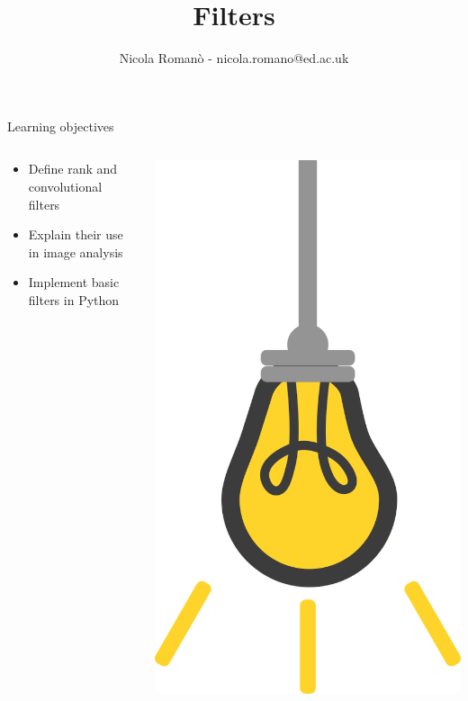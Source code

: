 \documentclass[9pt, aspectratio=169]{beamer}
\author{Nicola Roman\`o - nicola.romano@ed.ac.uk}
\title{Filters}
\date{}
\begin{document}

\begin{frame}
    \titlepage
\end{frame}

\begin{frame}
    {Learning objectives}
    \begin{columns}
        \begin{column}{0.8\textwidth}
            \begin{itemize}
                \item Define rank and convolutional filters
                \item Explain their use in image analysis
                \item Implement basic filters in Python
            \end{itemize}
        \end{column}
        \begin{column}{0.2\textwidth}
            \includegraphics[angle=-30, origin=tr, width=1.5\textwidth]{lightbulb.png}

\end{column}
\end{columns}
\end{frame}
\end{document}
